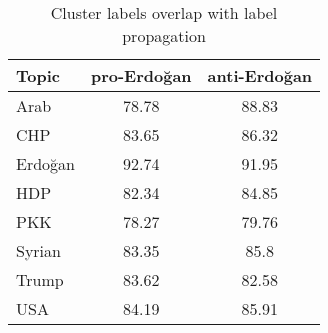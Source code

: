 \documentclass[letterpaper]{article} \usepackage{aaai20}  \usepackage{times}  \usepackage{stackengine}
\begin{document}
\begin{table}[H]
    \centering
    \begin{tabular}{l|c|c}
        Topic & pro-Erdo\u{g}an & anti-Erdo\u{g}an \\ \hline
        Arab & 78.78 & 88.83 \\
        CHP & 83.65 & 86.32 \\
        Erdo\u{g}an & 92.74 & 91.95 \\
        HDP & 82.34 & 84.85 \\
        PKK & 78.27 & 79.76 \\
        Syrian & 83.35 & 85.8 \\
        Trump & 83.62 & 82.58 \\
        USA & 84.19 & 85.91 \\
\end{tabular}
    \caption{Cluster labels overlap with label propagation}
    \label{tab:overlapWithLabelProp}
\end{table}
\end{document}

